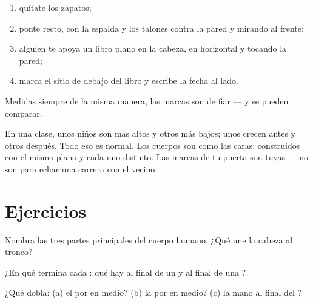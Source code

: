 \begin{method}\label{met:g1:my-body:measure}
\begin{enumerate}
  \item quítate los zapatos;
  \item ponte recto, con la espalda y los talones contra la pared y
        mirando al frente;
  \item alguien te apoya un libro plano en la cabeza, en horizontal y
        tocando la pared;
  \item marca el sitio de debajo del libro y escribe la fecha al lado.
\end{enumerate}
Medidas siempre de la misma manera, las marcas son de fiar --- y se
pueden comparar.
\end{method}

\begin{remark}\label{rem:g1:my-body:different}
En una clase, unos niños son más altos y otros más bajos; unos crecen
antes y otros después. Todo eso es normal. Los cuerpos son como las
caras: construidos con el mismo plano y cada uno distinto. Las marcas
de tu puerta son tuyas --- no son para echar una carrera con el vecino.
\end{remark}

\section{Ejercicios}

\begin{exercise}[$\star$]\label{exo:g1:my-body:1}
Nombra las tres partes principales del cuerpo humano. ¿Qué une la
cabeza al tronco?
\end{exercise}

\begin{exercise}[$\star$]\label{exo:g1:my-body:2}
¿En qué termina cada : qué hay al final de un  y al
final de una ?
\end{exercise}

\begin{exercise}[$\star$]\label{exo:g1:my-body:3}
¿Qué  dobla: (a) el  por en medio? (b) la  por
en medio? (c) la mano al final del ?
\end{exercise}

